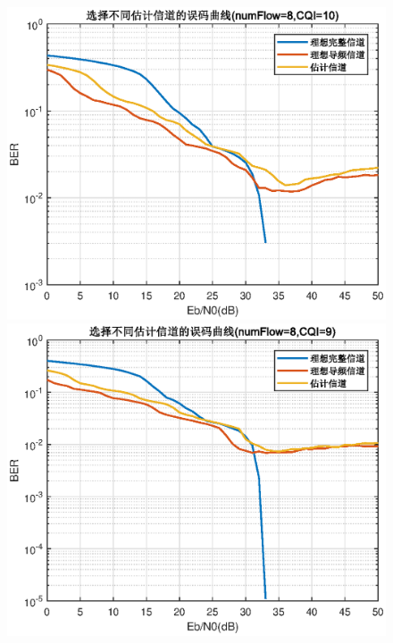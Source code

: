 \documentclass{article}
\begin{document}
\begin{figure}[htbp]
	\centering
	\begin{minipage}[t]{0.48\textwidth}
	\centering
	\includegraphics[width=\textwidth]{plot/plot_CQI10.eps}
	\end{minipage}
	\begin{minipage}[t]{0.48\textwidth}
	\centering
	\includegraphics[width=\textwidth]{plot/plot_CQI9.eps}
	\end{minipage}
\end{figure}
\end{document}
